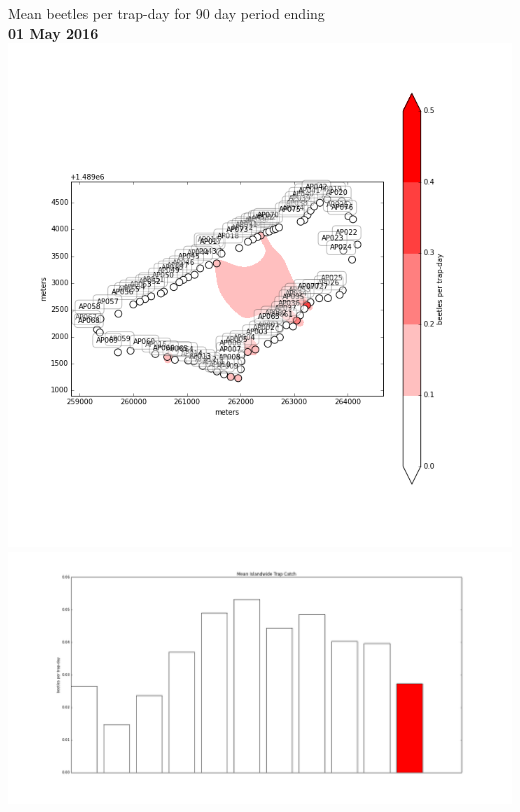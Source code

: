 \documentclass{beamer}
\begin{document}
\begin{frame}{Mean beetles per trap-day for 90 day period ending\\ \textbf{01 May 2016}}
\includegraphics[width=0.6\linewidth,valign=c]{2016-05-01.png}
\includegraphics[width=0.4\linewidth,valign=c]{bars2016-05-01.png}
\end{frame}
\end{document}
